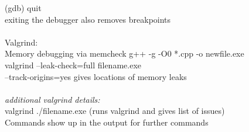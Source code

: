 \documentclass[11pt]{article}
\begin{document}
    (gdb) quit\\
    exiting the debugger also removes breakpoints\\
\\
Valgrind:\\
Memory debugging via memcheck
g++ -g -O0 *.cpp -o newfile.exe\\
valgrind --leak-check=full filename.exe\\
--track-origins=yes gives locations of memory leaks\\
\\
\textit{additional valgrind details:}\\
valgrind ./filename.exe (runs valgrind and gives list of issues)\\
Commands show up in the output for further commands\\


    
\end{document}
